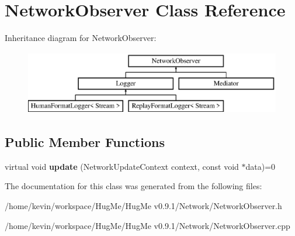 \hypertarget{classNetworkObserver}{
\section{NetworkObserver Class Reference}
\label{classNetworkObserver}
}
Inheritance diagram for NetworkObserver:\begin{figure}[H]
\begin{center}
\leavevmode
\includegraphics[height=2.78607cm]{classNetworkObserver}
\end{center}
\end{figure}
\subsection*{Public Member Functions}
\begin{DoxyCompactItemize}
\item 
\hypertarget{classNetworkObserver_a9eee41ce2b4dcc3ed580513dca0321b1}{
virtual void {\bfseries update} (NetworkUpdateContext context, const void $\ast$data)=0}
\label{classNetworkObserver_a9eee41ce2b4dcc3ed580513dca0321b1}

\end{DoxyCompactItemize}


The documentation for this class was generated from the following files:\begin{DoxyCompactItemize}
\item 
/home/kevin/workspace/HugMe/HugMe v0.9.1/Network/NetworkObserver.h\item 
/home/kevin/workspace/HugMe/HugMe v0.9.1/Network/NetworkObserver.cpp\end{DoxyCompactItemize}
